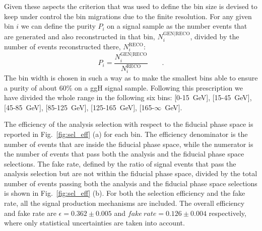 Given these aspects the criterion that was used to define the \pth bin size is devised to keep under control the bin migrations due to the finite resolution.
For any given bin $i$ we can define the purity $P_i$ on a signal sample as the number events that are generated and also reconstructed in that bin, $N_i^\mathrm{GEN|RECO}$, divided by the number of events reconstructed there, $N_i^\mathrm{RECO}$:
\begin{equation}
P_i = \frac{N_i^\mathrm{GEN|RECO}}{N_i^\mathrm{RECO}} \qquad .
\end{equation}
The bin width is chosen in such a way as to make the smallest bins able to ensure a purity of about 60\% on a ggH signal sample.
Following this prescription we have divided the whole \pth range in the following six bins: \mbox{[0-15 GeV]}, \mbox{[15-45 GeV]}, \mbox{[45-85 GeV]}, \mbox{[85-125 GeV]}, \mbox{[125-165 GeV]}, \mbox{[165-$\infty$ GeV]}.

The efficiency of the analysis selection with respect to the fiducial phase space is reported in Fig.~\ref{fig:sel_eff} (a) for each \pth bin. The efficiency denominator is the number of events that are inside the fiducial phase space, while the numerator is the number of events that pass both the analysis and the fiducial phase space selections. The fake rate, defined by the ratio of signal events that pass the analysis selection but are not within the fiducial phase space, divided by the total number of events passing both the analysis and the fiducial phase space selections is shown in Fig.~\ref{fig:sel_eff} (b). For both the selection efficiency and the fake rate, all the signal production mechanisms are included.
The overall efficiency and fake rate are $\epsilon=0.362\pm{0.005}$ and $fake~rate=0.126\pm0.004$ respectively, where only statistical uncertainties are taken into account.

